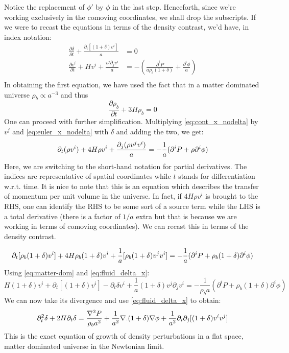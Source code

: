 \documentclass[12pt,a4paper,oneside]{book}
\def\pa{{\partial}}
\begin{document}
			Notice the replacement of $\phi'$ by $\phi$ in the last step. Henceforth, since we're working exclusively in the comoving coordinates, we shall drop the subscripts. If we were to recast the equations in terms of the density contrast, we'd have, in index notation:
			\begin{equation}
				\begin{aligned}
					\frac{\partial \delta}{\partial t}+\frac{\partial_i\left[(1+\delta)v^i\right]}{a}&=0\\
					\frac{\partial v^i}{\partial t}+Hv^i+\frac{v^j\partial_jv^i}{a}&=-\left(\frac{\partial^i P}{a\rho_b(1+\delta)}+\frac{\partial^i\phi}{a}\right)\\
				\end{aligned}
				\label{eq:fluid_delta_x}
			\end{equation}
			In obtaining the first equation, we have used the fact that in a matter dominated universe $\rho_b\propto a^{-3}$ and thus
			\begin{equation}
				\frac{\partial \rho_b}{\partial t}+3H\rho_b=0
				\label{eq:matter-dom}
			\end{equation}
			One can proceed with further simplification. Multiplying \ref{eq:cont_x_nodelta} by $v^j$ and \ref{eq:euler_x_nodelta} with $\delta$ and adding the two, we get:
			\begin{equation}
				\partial_t(\rho v^i)+4H\rho v^i+\frac{\partial_j(\rho v^jv^i)}{a}=-\frac{1}{a}(\partial^iP+\rho\partial^i\phi)\\
				\label{eq:rho-vi_combo}
			\end{equation}
			Here, we are switching to the short-hand notation for partial derivatives. The indices are representative of spatial coordinates while $t$ stands for differentiation w.r.t. time. It is nice to note that this is an equation which describes the transfer of momentum per unit volume in the universe. In fact, if $4H\rho v^i$ is brought to the RHS, one can identify the RHS to be some sort of a source term while the LHS is a total derivative (there is a factor of $1/a$ extra but that is because we are working in terms of comoving coordinates). We can recast this in terms of the density contrast.
			
				$$
					\pa_t[\rho_b(1+\delta)v^i]+4H\rho_b(1+\delta)v^i+\frac{1}{a}[\rho_b(1+\delta)v^jv^i]=-\frac{1}{a}(\pa^iP+\rho_b(1+\delta)\pa^i\phi)\\
				$$
			Using \ref{eq:matter-dom} and \ref{eq:fluid_delta_x}:
			$$
			H(1+\delta)v^i+\pa_t[(1+\delta)v^i]-\pa_t\delta v^i+\frac{1}{a}(1+\delta)v^j\pa_jv^i=-\frac{1}{\rho_ba}(\pa^iP+\rho_b(1+\delta)\pa^i\phi)
			$$
			We can now take its divergence and use \ref{eq:fluid_delta_x} to obtain:
			\begin{equation}
				\pa_t^2\delta+2H\pa_t\delta=\frac{\nabla^2P}{\rho_ba^2}+\frac{1}{a^2}\nabla.(1+\delta)\nabla\phi+\frac{1}{a^2}\pa_i\pa_j[(1+\delta)v^iv^j]\\
				\label{eq:newt-perturb-exact}
			\end{equation}
			This is the exact equation of growth of density perturbations in a flat space, matter dominated universe in the Newtonian limit.			
\end{document}
